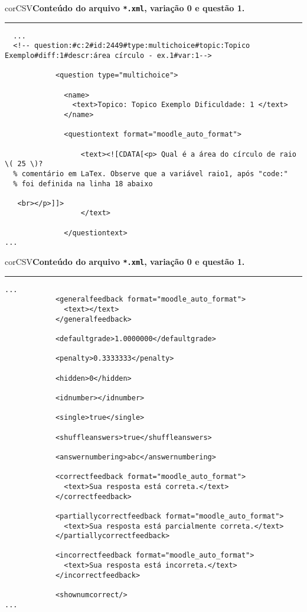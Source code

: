 \begin{myboxCode}{corCSV}{\textbf{Conteúdo do arquivo \texttt{*.xml}, variação 0 e questão 1.}}\vspace{3mm}
  \hrule
  {\scriptsize
  \begin{verbatim}
  ...
  <!-- question:#c:2#id:2449#type:multichoice#topic:Topico Exemplo#diff:1#descr:área círculo - ex.1#var:1-->
  
            <question type="multichoice">
  
              <name>
                <text>Topico: Topico Exemplo Dificuldade: 1 </text>
              </name>
              
              <questiontext format="moodle_auto_format">
              
                  <text><![CDATA[<p> Qual é a área do círculo de raio \( 25 \)?
  % comentário em LaTex. Observe que a variável raio1, após "code:" 
  % foi definida na linha 18 abaixo
  
   <br></p>]]>
                  </text>
  
              </questiontext>
...
\end{verbatim}
}
\end{myboxCode}
            
\begin{myboxCode}{corCSV}{\textbf{Conteúdo do arquivo \texttt{*.xml}, variação 0 e questão 1.}}\vspace{3mm}
\hrule
{\scriptsize
\begin{verbatim}
...
            <generalfeedback format="moodle_auto_format">
              <text></text>
            </generalfeedback>
            
            <defaultgrade>1.0000000</defaultgrade>
            
            <penalty>0.3333333</penalty>

            <hidden>0</hidden>
            
            <idnumber></idnumber>
            
            <single>true</single>
            
            <shuffleanswers>true</shuffleanswers>
            
            <answernumbering>abc</answernumbering>
            
            <correctfeedback format="moodle_auto_format">
              <text>Sua resposta está correta.</text>
            </correctfeedback>
            
            <partiallycorrectfeedback format="moodle_auto_format">
              <text>Sua resposta está parcialmente correta.</text>
            </partiallycorrectfeedback>
            
            <incorrectfeedback format="moodle_auto_format">
              <text>Sua resposta está incorreta.</text>
            </incorrectfeedback>

            <shownumcorrect/>    
...
\end{verbatim}
}
\end{myboxCode}


